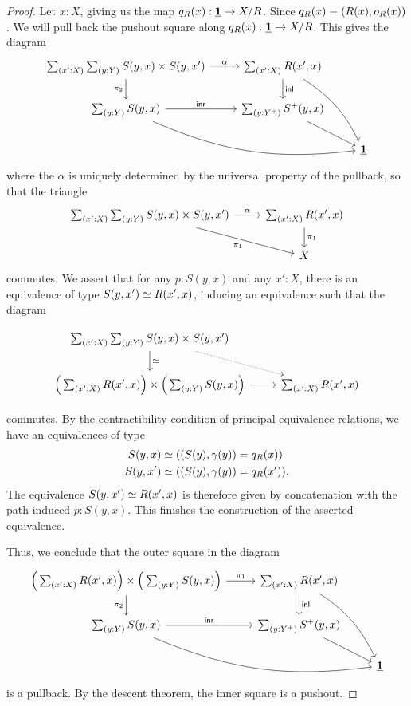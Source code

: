 \begin{proof}
Let $x:X$, giving us the map $q_R(x):\underline{\mathbf{1}}\to X/R$. Since $q_R(x)\equiv{\mathopen{}(R(x),o_R(x))\mathclose{}}$. We will pull back the pushout square along $q_R(x):\underline{\mathbf{1}}\to X/R$. This gives the diagram
\begin{equation*}
\begin{tikzcd}
\sm{x':X}{y:Y} S(y,x)\times S(y,x') \arrow[r,densely dotted,"\alpha"] \arrow[d,swap,"\pi_2"] & \sm{x':X}R(x',x) \arrow[d,"\inl"] \arrow[ddr,bend left=15] \\
\sm{y:Y}S(y,x) \arrow[r,"\inr"] \arrow[drr,bend right=15] & \sm{y:Y^+}S^+(y,x) \arrow[dr] \\
& & \unit
\end{tikzcd}
\end{equation*}
where the $\alpha$ is uniquely determined by the universal property of the pullback, so that 
the triangle
\begin{equation*}
\begin{tikzcd}
\sm{x':X}{y:Y} S(y,x)\times S(y,x') \arrow[r,densely dotted,"\alpha"] \arrow[dr,swap,"\pi_1"] & \sm{x':X}R(x',x) \arrow[d,"\pi_1"] \\
& X
\end{tikzcd}
\end{equation*}
commutes. We assert that for any $p:S(y,x)$ and any $x':X$, there is an equivalence of type $\eqv{S(y,x')}{R(x',x)}$, inducing an equivalence such that the diagram
\begin{small}
\begin{equation*}
\begin{tikzcd}
\sm{x':X}{y:Y} S(y,x)\times S(y,x') \arrow[dr,densely dotted] \arrow[d,"\eqvsym"] \\
\Big(\sm{x':X}R(x',x)\Big)\times\Big(\sm{y:Y}S(y,x)\Big) \arrow[r] & \sm{x':X}R(x',x)
\end{tikzcd}
\end{equation*}
\end{small}
commutes. By the contractibility condition of principal equivalence relations, we have an equivalences of type 
\begin{align*}
S(y,x) & \simeq ({\mathopen{}(S(y),\gamma(y))\mathclose{}}=q_R(x)) \\
S(y,x') & \simeq ({\mathopen{}(S(y),\gamma(y))\mathclose{}}=q_R(x')).
\end{align*} 
The equivalence $\eqv{S(y,x')}{R(x',x)}$ is therefore given by concatenation with the path induced $p:S(y,x)$. This finishes the construction of the asserted equivalence.

Thus, we conclude that the outer square in the diagram
\begin{equation*}
\begin{tikzcd}
\Big(\sm{x':X}R(x',x)\Big)\times\Big(\sm{y:Y}S(y,x)\Big) \arrow[r,"\pi_1"] \arrow[d,swap,"\pi_2"] & \sm{x':X}R(x',x) \arrow[d,"\inl"] \arrow[ddr,bend left=15] \\
\sm{y:Y}S(y,x) \arrow[r,"\inr"] \arrow[drr,bend right=15] & \sm{y:Y^+}S^+(y,x) \arrow[dr] \\
& & \unit
\end{tikzcd}
\end{equation*}
is a pullback. By the descent theorem, the inner square is a pushout.
\end{proof}

